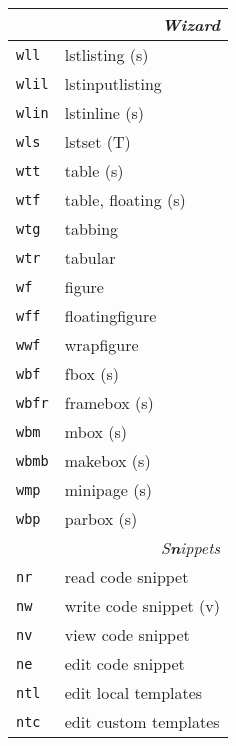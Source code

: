 \documentclass[oneside,10pt,landscape,DIV16]{scrartcl}
\newcommand{\Map}[1] {\textbf{\textasciiacute}\texttt{#1}}
\begin{document}
\begin{multicols}{3}
\begin{center}
\begin{tabular}[]{|p{11mm}|p{60mm}|}
\hline
\multicolumn{2}{|r|}{\textsl{\textbf{W}izard}}\\[1.0ex]
\hline  \Map{wll}  & lstlisting               \hfill (s)\\
\hline  \Map{wlil} & lstinputlisting          \\
\hline  \Map{wlin} & lstinline                \hfill (s)\\
\hline  \Map{wls}  & lstset                   \hfill (T)\\
\hline
\hline  \Map{wtt}  & table                    \hfill (s)\\
\hline  \Map{wtf}  & table, floating          \hfill (s)\\
\hline  \Map{wtg}  & tabbing                  \\
\hline  \Map{wtr}  & tabular                  \\
\hline
\hline  \Map{wf}   & figure                   \\
\hline  \Map{wff}  & floatingfigure           \\
\hline  \Map{wwf}  & wrapfigure               \\
\hline
\hline  \Map{wbf}  & fbox                     \hfill (s)\\
\hline  \Map{wbfr} & framebox                 \hfill (s)\\
\hline  \Map{wbm}  & mbox                     \hfill (s)\\
\hline  \Map{wbmb} & makebox                  \hfill (s)\\
\hline  \Map{wmp}  & minipage                 \hfill (s)\\
\hline  \Map{wbp}  & parbox                   \hfill (s)\\
\hline
\hline
\multicolumn{2}{|r|}{\textsl{S\textbf{n}ippets}}                \\[1.0ex]
\hline \Map{nr}  & read code snippet         \\
\hline \Map{nw}  & write code snippet        \hfill (v)\\
\hline \Map{nv}  & view code snippet         \\
\hline \Map{ne}  & edit code snippet         \\
\hline
\hline \Map{ntl} & edit local templates      \\
\hline \Map{ntc} & edit custom templates     \\

\end{tabular}
\end{center}
\end{multicols}
\end{document}
